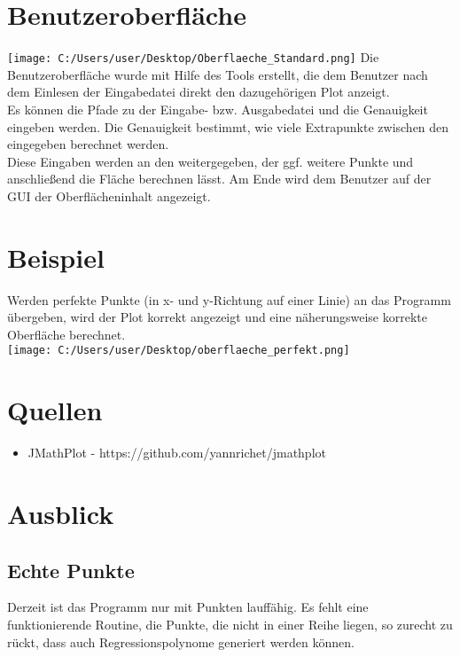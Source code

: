 \documentclass[11pt, bibliography=totocnumbered]{scrartcl}
\begin{document}
\section{Benutzeroberfl\"ache}
\hspace*{1cm}
\texttt{[image: C:/Users/user/Desktop/Oberflaeche\_Standard.png]}
\newline
Die Benutzeroberfl\"ache wurde mit Hilfe des Tools  erstellt, die dem Benutzer nach dem Einlesen der Eingabedatei direkt den dazugeh\"origen Plot anzeigt. \\ 
Es k\"onnen die Pfade zu der Eingabe- bzw. Ausgabedatei und die Genauigkeit eingeben werden. Die Genauigkeit bestimmt, wie viele Extrapunkte zwischen den eingegeben berechnet werden. \\
Diese Eingaben werden an den  weitergegeben, der ggf. weitere Punkte und anschlie{\ss}end die Fl\"ache berechnen l\"asst. Am Ende wird dem Benutzer auf der GUI der Oberfl\"acheninhalt angezeigt. 

\section{Beispiel}
Werden perfekte Punkte (in x- und y-Richtung auf einer Linie) an das Programm \"ubergeben, wird der Plot korrekt angezeigt und eine n\"aherungsweise korrekte Oberfl\"ache berechnet. \\
\texttt{[image: C:/Users/user/Desktop/oberflaeche\_perfekt.png]}
\section{Quellen}
\begin{itemize}
\item JMathPlot - https://github.com/yannrichet/jmathplot
\end{itemize}

\section{Ausblick}
\subsection{Echte Punkte}
Derzeit ist das Programm nur mit  Punkten lauff\"ahig. Es fehlt eine funktionierende Routine, die Punkte, die nicht in einer Reihe liegen, so zurecht zu r\"uckt, dass auch Regressionspolynome generiert werden k\"onnen.
\end{document}
